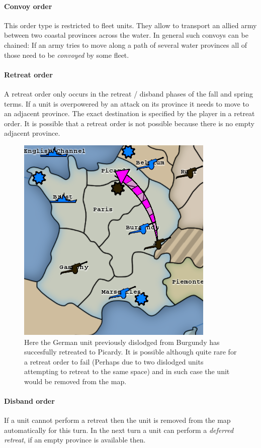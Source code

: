 \documentclass[pdftex,11pt,a4paper]{report}
\begin{document}
\paragraph{Convoy order}
This order type is restricted to fleet units. They allow to transport
an allied army between two coastal provinces across the water. In general
such convoys can be chained: If an army tries to move along a path of
several water provinces all of those need to be \textit{convoyed} 
by some fleet.

\paragraph{Retreat order}
A retreat order only occurs in the retreat / disband phases of the
fall and spring terms. If a unit is overpowered by an attack on its
province it needs to move to an adjacent province. The exact destination
is specified by the player in a retreat order. It is possible that
a retreat order is not possible because there is no empty adjacent
province.

\begin{figure}
\includegraphics[scale=0.75]{./screenshots/DefRetreat2.png} \\[1cm] 
Here the German unit previously dislodged from Burgundy has
succesfully retreated to Picardy.  It is possible although quite rare
for a retreat order to fail (Perhaps due to two dislodged units
attempting to retreat to the same space) and in such case the unit
would be removed from the map.
\end{figure}

\paragraph{Disband order}
If a unit cannot perform a retreat then the unit is removed from the
map automatically for this turn. In the next turn a unit can 
perform a \textit{deferred retreat}, if an empty province is 
available then.
\end{document}
